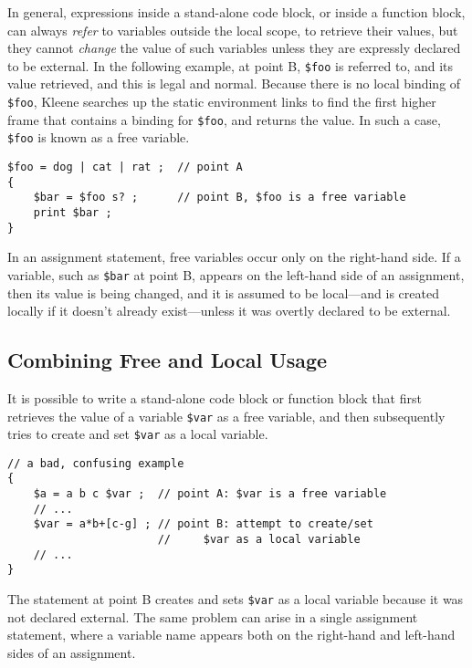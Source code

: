 In general, expressions inside a stand-alone code block, or inside a function block, can
always \emph{refer} to variables outside the local scope, to retrieve their values, but
they cannot \emph{change} the value of such variables unless they are expressly declared to be
external. In the following example, at point B, \verb!$foo! is referred to, and its
value retrieved, and this is legal and normal.  Because there is no local binding of
\verb!$foo!, Kleene searches up the static environment links to find the first higher
frame that contains a binding for \verb!$foo!,  and returns the value.  In such a case,
\verb!$foo! is known as a free variable.

\begin{samepage}
\begin{Verbatim}
$foo = dog | cat | rat ;  // point A
{
    $bar = $foo s? ;      // point B, $foo is a free variable
    print $bar ;
}
\end{Verbatim}
\end{samepage}

\noindent 
In an assignment statement, free variables occur only on the right-hand side.
If a variable, such as \verb!$bar! at point B, 
appears on the left-hand side of an assignment, then its value is being
changed, and it is assumed to be local---and is created locally if it doesn't already
exist---unless it was overtly declared to be external.

\subsection{Combining Free and Local Usage}

It is possible to write a stand-alone code block or function block that first retrieves
the value of a
variable \verb!$var! as a free variable, and then subsequently tries to create and set
\verb!$var! as a local variable.

\begin{samepage}
\begin{Verbatim}
// a bad, confusing example
{
    $a = a b c $var ;  // point A: $var is a free variable
    // ...
    $var = a*b+[c-g] ; // point B: attempt to create/set
                       //     $var as a local variable
    // ...
}
\end{Verbatim}
\end{samepage}

\noindent
The statement at point B creates and sets \verb!$var! as a local variable because it was
not declared external.  The same problem can arise in a single assignment statement,
where a variable name appears both on the right-hand and left-hand sides of an
assignment.

